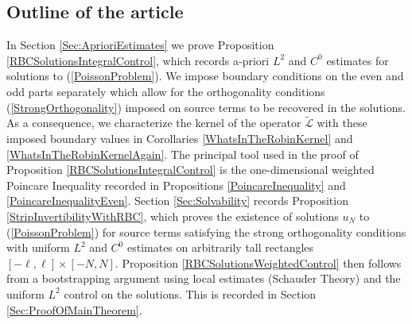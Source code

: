 \documentclass{amsart}
\newcommand{\mc}{\mathcal}
\newcommand{\wt}{\widetilde}
\begin{document}
\subsection{Outline of the article}
In Section \ref{Sec:AprioriEstimates} we prove Proposition \ref{RBCSolutionsIntegralControl},  which records a-priori  $L^2$ and $C^{0}$  estimates  for solutions to (\ref{PoissonProblem}). We impose boundary conditions on the even and odd parts separately which allow for the orthogonality conditions  (\ref{StrongOrthogonality}) imposed on source terms to be recovered in the solutions. As a consequence, we characterize the kernel of the operator $\wt{\mc{L}}$ with these imposed boundary values in Corollaries \ref{WhatsInTheRobinKernel} and \ref{WhatsInTheRobinKernelAgain}. The principal tool used in the proof of   Proposition \ref{RBCSolutionsIntegralControl} is the one-dimensional weighted Poincare Inequality recorded in Propositions \ref{PoincareInequality} and \ref{PoincareInequalityEven}.  Section \ref{Sec:Solvability}   records Proposition \ref{StripInvertibilityWithRBC}, which proves the existence of solutions  $u_N$ to (\ref{PoissonProblem}) for  source terms satisfying the strong orthogonality conditions  with  uniform $L^2$ and $C^{0}$ estimates on arbitrarily tall rectangles $[-\ell, \ell] \times [-N, N]$. Proposition   \ref{RBCSolutionsWeightedControl} then  follows from a bootstrapping argument using  local estimates (Schauder Theory)  and the uniform $L^2$ control on the solutions. This is recorded in Section \ref{Sec:ProofOfMainTheorem}.  
  
\end{document}
